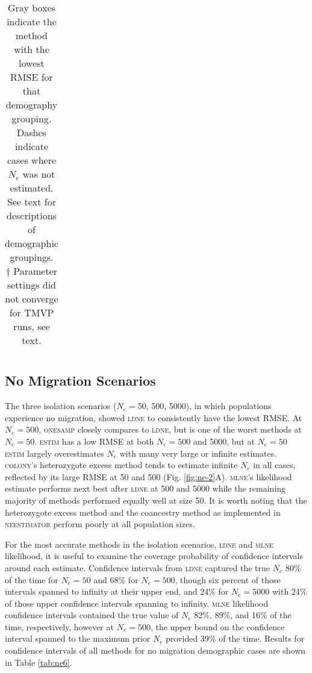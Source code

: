 \begin{table}[]
\begin{tabular}{llllllllllll}
\end{tabular}
\caption*{\small{Gray boxes indicate the method with the lowest RMSE for that demography grouping. 
Dashes indicate cases where $N_e$ was not estimated. See text for descriptions of 
demographic groupings.} \\
\footnotesize{$\dagger$ Parameter settings did not converge for \textsc{TMVP} runs, see text.}}
\label{tab:ne-2}
\end{table}

\subsection{No Migration Scenarios}
The three isolation scenarios ($N_e = 50$, 500, 5000), in which populations experience 
no migration, showed \textsc{ldne} to consistently have the lowest RMSE. At $N_e = 500$, \textsc{onesamp} closely compares to 
\textsc{ldne}, but is one of the worst methods at $N_e = 50$. \textsc{estim} has a low RMSE 
at both $N_e = 500$ and 5000, but at $N_e = 50$ \textsc{estim} largely overestimates 
$N_e$ with many very large or infinite estimates. \textsc{colony}'s heterozygote 
excess method tends to estimate infinite $N_e$ in all cases, reflected by its 
large RMSE at 50 and 500 (Fig. \ref{fig:ne-2}A). \textsc{mlne}'s likelihood estimate performs next best 
after \textsc{ldne} at 500 and 5000 while the remaining majority of methods performed equally 
well at size 50. It is worth noting that the heterozygote excess method \citep{Pudovkin:1996} 
and the coancestry method \citep{Nomura:2008} as implemented in \textsc{neestimator} perform poorly at all population sizes.

For the most accurate methods in the isolation scenarios, \textsc{ldne} and \textsc{mlne} 
likelihood, it is useful to examine the coverage probability of confidence intervals around 
each estimate. Confidence intervals from \textsc{ldne} captured the true $N_e$ 80\% 
of the time for $N_e = 50$ and 68\% for $N_e = 500$, though six percent of 
those intervals spanned to infinity at their upper end, and 24\% for $N_e = 500$0 with 
24\% of those upper confidence intervals spanning to infinity. \textsc{mlne} likelihood confidence 
intervals contained the true value of $N_e$ 82\%, 89\%, and 16\% of the time, respectively, 
however at $N_e = 500$, the upper bound on the confidence interval spanned to the maximum 
prior $N_e$ provided 39\% of the time. Results for confidence intervals of all methods 
for no migration demographic cases are shown in Table \ref{tab:ne6}.

